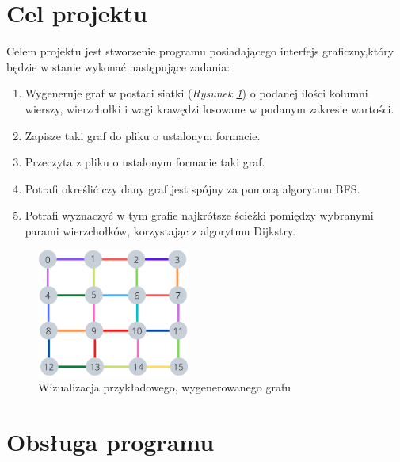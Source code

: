 \documentclass{article}
\begin{document}
\section{Cel projektu}
Celem projektu jest stworzenie programu posiadającego interfejs graficzny,\linebreak który będzie w stanie wykonać następujące zadania:
\begin{enumerate}
    \item Wygeneruje graf w postaci siatki (\emph{Rysunek \ref{fig:graf_pp}}) o podanej ilości kolumn\linebreak i wierszy, wierzchołki i wagi krawędzi losowane w podanym zakresie wartości.
    \item Zapisze taki graf do pliku o ustalonym formacie.
    \item Przeczyta z pliku o ustalonym formacie taki graf.
    \item Potrafi określić czy dany graf jest spójny za pomocą algorytmu BFS.
    \item Potrafi wyznaczyć w tym grafie najkrótsze ścieżki pomiędzy wybranymi parami wierzchołków, korzystając z algorytmu Dijkstry.
\end{enumerate}

\begin{figure}[htp]
        \centering
        \includegraphics[width=5cm]{images/graf_pp.png}
        \caption{Wizualizacja przykładowego, wygenerowanego grafu}
        \label{fig:graf_pp}
\end{figure}

\newpage

\section{Obsługa programu}
\end{document}
